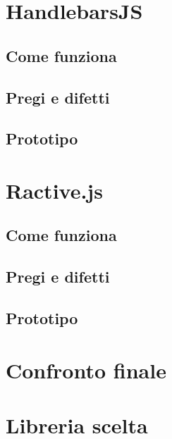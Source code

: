 \FloatBarrier
\section{HandlebarsJS}

\subsection{Come funziona}

\subsection{Pregi e difetti}

\subsection{Prototipo}


\FloatBarrier
\section{Ractive.js}

\subsection{Come funziona}

\subsection{Pregi e difetti}

\subsection{Prototipo}


\clearpage
\section{Confronto finale}

\FloatBarrier
\section{Libreria scelta}

